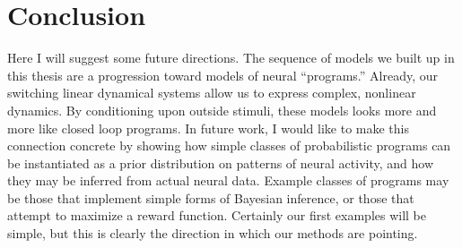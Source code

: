 \chapter{Conclusion}
\label{conclusion}

Here I will suggest some future directions. The sequence of models we built up 
in this thesis are a progression toward models of neural ``programs.'' Already, 
our switching linear dynamical systems allow us to express complex, nonlinear 
dynamics. By conditioning upon outside stimuli, these models looks more and more 
like closed loop programs. In future work, I would like to make this connection 
concrete by showing how simple classes of probabilistic programs can be 
instantiated as a prior distribution on patterns of neural activity, and how 
they may be inferred from actual neural data. Example classes of programs 
may be those that implement simple forms of Bayesian inference, or those 
that attempt to maximize a reward function. Certainly our first examples will 
be simple, but this is clearly the direction in which our methods are pointing. 
